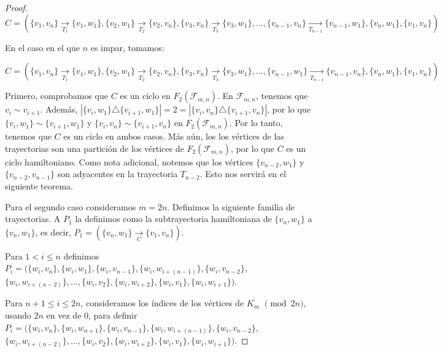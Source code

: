 \begin{proof}
    $C=(\{v_1,v_n\} \xrightarrow[T_1]{}\{v_1,w_1\},\{v_2,w_1\}
    \xrightarrow[T_2]{}\{v_2,v_n\},\{v_3,v_n\} \xrightarrow[T_3]{}\{v_3,w_1\},
    \dots, \{v_{n-1},v_n\}
    \xrightarrow[T_{n-1}]{}\{v_{n-1},w_1\},\{v_n,w_1\},\{v_1,v_n\})$

    En el caso en el que $n$ es impar, tomamos:

    $C=(\{v_1,v_n\} \xrightarrow[T_1]{}\{v_1,w_1\},\{v_2,w_1\}
    \xrightarrow[T_2]{}\{v_2,v_n\},\{v_3,v_n\} \xrightarrow[T_3]{}\{v_3,w_1\},
    \dots, \{v_{n-1},w_1\}
    \xrightarrow[T_{n-1}]{}\{v_{n-1},v_n\},\{v_n,w_1\},\{v_1,v_n\})$

    Primero, comprobamos que $C$ es un ciclo en $F_2(\mathcal{F}_{m,n})$. En
    $\mathcal{F}_{m,n}$, tenemos que $v_i \sim v_{i+1}$. Adem\'as,
    $|\{v_i,w_1\}\triangle \{v_{i+1},w_1\}|=2 =|\{v_i,v_n\}\triangle
    \{v_{i+1},v_n\}|$, por lo que $\{v_i,w_1\}\sim \{v_{i+1},w_1\}$ y
    $\{v_i,v_n\}\sim \{v_{i+1},v_n\}$ en $F_2(\mathcal{F}_{m,n})$. Por lo tanto,
    tenemos que $C$ es un ciclo en ambos casos. M\'as a\'un, los los v\'ertices
    de las trayectorias son una partici\'on de los v\'ertices de
    $F_2(\mathcal{F}_{m,n})$, por lo que $C$ es un ciclo hamiltoniano. Como nota
    adicional, notemos que los v\'ertices $\{v_{n-2},w_1\}$ y
    $\{v_{n-2},v_{n-1}\}$ son adyacentes en la trayectoria $T_{n-2}$. Esto nos
    servir\'a en el siguiente teorema.

    Para el segundo caso consideramos $m=2n$. Definimos la siguiente familia de
    trayectorias. A $P_1$ la definimos como la subtrayectoria hamiltoniana de
    $\{v_n,w_1\}$ a $\{v_n,w_1\}$, es decir, $P_1= (\{v_n,w_1\}
    \xrightarrow[C]{}\{v_1,v_n\})$. 
    
    Para $1 < i \leq n$ definimos
    $P_i=(\{w_i,v_n\},\{w_i,w_1\},\{w_i,v_{n-1}\},\{w_i,w_{i+(n-1)}\},\{w_i,v_{n-2}\}$,
    $\{w_i,w_{i+(n-2)}\},\dots,\{w_i,v_2\},\{w_i,w_{i+2}\},\{w_i,v_1\},\{w_i,w_{i+1}\})$.

    Para $n+1\leq i \leq 2n$, consideramos los \'indices de los v\'ertices de
    $\overline{K_m}$ $\pmod {2n}$, usando $2n$ en vez de $0$, para definir $P_i =
    (\{w_i,v_n\}, \{w_i,w_{n+1}\}, \{w_i,v_{n-1}\}, \{w_i,w_{i+(n-1)}\},
    \{w_i,v_{n-2}\}$, $\{w_i,w_{i+(n-2)}\}, \dots, \{w_i,v_2\}, \{w_i,w_{i+2}\},
    \{w_i,v_1\}, \{w_i,w_{i+1}\})$.


\end{proof}
